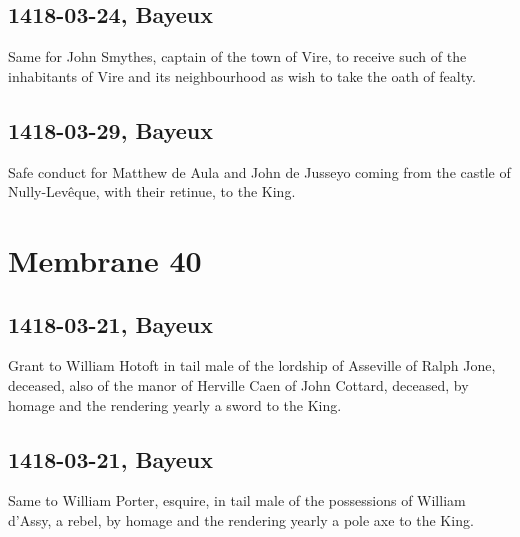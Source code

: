 \documentclass[a4paper,12pt,twoside]{book}
\begin{document}
                
                \subsection{1418-03-24, Bayeux}
                
                
                     Same for John Smythes, captain of the town of Vire, to receive such of the inhabitants of Vire and its neighbourhood as wish to take the oath of fealty.
                  
                
                \subsection{1418-03-29, Bayeux}
                
                
                     Safe conduct for Matthew de Aula and John de Jusseyo coming from the castle of Nully-Levêque, with their retinue, to the King.
                  
                \newpage
            
            
            \section{Membrane 40}
            
            
                
                \subsection{1418-03-21, Bayeux}
                
                
                  Grant to William Hotoft in tail male of the lordship of Asseville of Ralph Jone, deceased, also of the manor of Herville Caen of John Cottard, deceased, by homage and the rendering yearly a sword to the King.
               
                
                \subsection{1418-03-21, Bayeux}
                
                
                  Same to William Porter, esquire, in tail male of the possessions of William d'Assy, a rebel, by homage and the rendering yearly a pole axe to the King.
               
\end{document}
